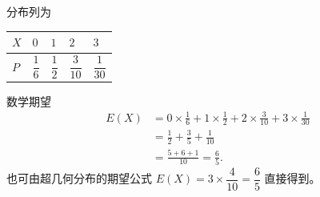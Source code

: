 \begin{answer}
分布列为

\begin{center}
\begin{tabular}{lllll}
\toprule
$X$ & $0$ & $1$ & $2$ & $3$ \\
\midrule
$P$ & $\dfrac16$ & $\dfrac12$ & $\dfrac3{10}$ & $\dfrac1{30}$ \\
\bottomrule
\end{tabular}
\end{center}

数学期望
\nopagebreak[4]
\[\begin{aligned}
E(X)&=0\times\frac16+1\times\frac12+2\times\frac3{10}+3\times\frac1{30}\\
&=\frac12+\frac35+\frac1{10}\\
&=\frac{5+6+1}{10}=\frac65.
\end{aligned}\]
也可由超几何分布的期望公式 $E(X)=3\times\dfrac4{10}=\dfrac65$ 直接得到。



\end{answer}
